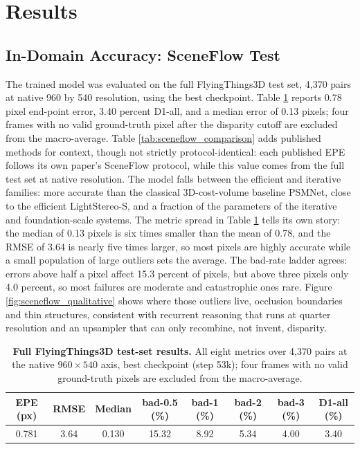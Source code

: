 \FloatBarrier
\section{Results}

\subsection{In-Domain Accuracy: SceneFlow Test}
The trained model was evaluated on the full FlyingThings3D test set,
4,370 pairs at native 960 by 540 resolution, using the best checkpoint.
Table \ref{tab:sceneflow_results} reports 0.78 pixel end-point error,
3.40 percent D1-all, and a median error of 0.13 pixels; four frames with
no valid ground-truth pixel after the disparity cutoff are excluded from
the macro-average. Table \ref{tab:sceneflow_comparison} adds published
methods for context, though not strictly protocol-identical: each
published EPE follows its own paper's SceneFlow protocol, while this
value comes from the full test set at native resolution. The model falls
between the efficient and iterative families: more accurate than the
classical 3D-cost-volume baseline PSMNet, close to the efficient
LightStereo-S, and a fraction of the parameters of the iterative and
foundation-scale systems. The metric spread in Table
\ref{tab:sceneflow_results} tells its own story: the median of 0.13
pixels is six times smaller than the mean of 0.78, and the RMSE of 3.64
is nearly five times larger, so most pixels are highly accurate while a
small population of large outliers sets the average. The bad-rate ladder
agrees: errors above half a pixel affect 15.3 percent of pixels, but
above three pixels only 4.0 percent, so most failures are moderate and
catastrophic ones rare. Figure \ref{fig:sceneflow_qualitative} shows
where those outliers live, occlusion boundaries and thin structures,
consistent with recurrent reasoning that runs at quarter resolution and
an upsampler that can only recombine, not invent, disparity.

\begin{table}[!htbp]
\centering
\caption{\textbf{Full FlyingThings3D test-set results.} All eight metrics over 4{,}370 pairs at the native $960\times 540$ axis, best checkpoint (step 53k); four frames with no valid ground-truth pixels are excluded from the macro-average.}
\label{tab:sceneflow_results}
\small
\begin{tabular}{cccccccc}
\toprule
EPE (px) & RMSE & Median & bad-0.5 (\%) & bad-1 (\%) & bad-2 (\%) & bad-3 (\%) & D1-all (\%)\\
\midrule
0.781 & 3.64 & 0.130 & 15.32 & 8.92 & 5.34 & 4.00 & 3.40\\
\bottomrule
\end{tabular}
\end{table}

